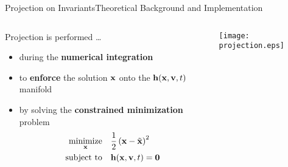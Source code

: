 \begin{frame}{Projection on Invariants}{Theoretical Background and Implementation}
  \begin{columns}
    \begin{column}[c]{0.6\textwidth}
      Projection is performed \dots
      \begin{itemize}
        \item during the \textbf{numerical integration}
        \item to \textbf{enforce} the solution $\mathbf{x}$ onto the $\mathbf{h}(\mathbf{x}, \mathbf{v}, t)$ manifold
        \item by solving the \textbf{constrained minimization} problem
          \begin{align*}
            \underset{\mathbf{x}}{\text{minimize}} \quad &\dfrac{1}{2}\left(\mathbf{x} - \tilde{\mathbf{x}}\right)^2 \\
            \text{subject to} \quad &\mathbf{h}(\mathbf{x}, \mathbf{v}, t) = \mathbf{0}
          \end{align*}
        \end{itemize}
      \end{column}
      \begin{column}[c]{0.4\textwidth}
        \hspace{-0.2\textwidth}\texttt{[image: projection.eps]}
      \end{column}
    \end{columns}
    \vspace{1.0em}
\end{frame}

